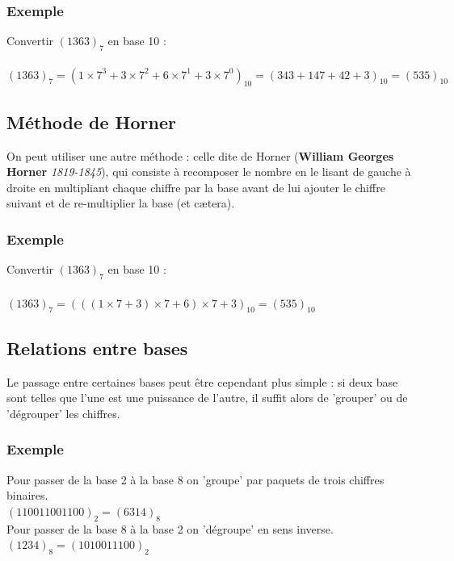 \documentclass[a4paper,10pt]{book}
\begin{document}
\subsubsection{Exemple}
Convertir $(1363)_{7}$ en base 10 :\\\\
$(1363)_{7}=(1\times 7^{3}+3\times 7^{2}+6\times 7^{1}+3\times 7^{0})_{10}=(343+147+42+3)_{10}=(535)_{10}$

\subsection{Méthode de Horner}
On peut utiliser une autre méthode : celle dite de Horner (\textbf{William Georges Horner} \emph{1819-1845}), qui consiste à recomposer le nombre en le lisant de gauche à droite en multipliant chaque chiffre par la base avant de lui ajouter le chiffre suivant et de re-multiplier la base (et cætera).

\subsubsection{Exemple}
Convertir $(1363)_{7}$ en base 10 :\\\\
$(1363)_{7}=(((1\times 7 +3)\times 7 +6)\times 7+ 3)_{10}=(535)_{10}$

\subsection{Relations entre bases}
Le passage entre certaines bases peut être cependant plus simple : si deux base sont telles que l'une est une puissance de l'autre, il suffit alors de 'grouper' ou de 'dégrouper' les chiffres.

\subsubsection{Exemple}
Pour passer de la base 2 à la base 8 on 'groupe' par paquets de trois chiffres binaires.\\
$(110011001100)_{2}=(6314)_{8}$\\

Pour passer de la base 8 à la base 2 on 'dégroupe' en sens inverse.\\
$(1234)_{8}=(1010011100)_{2}$
\end{document}
